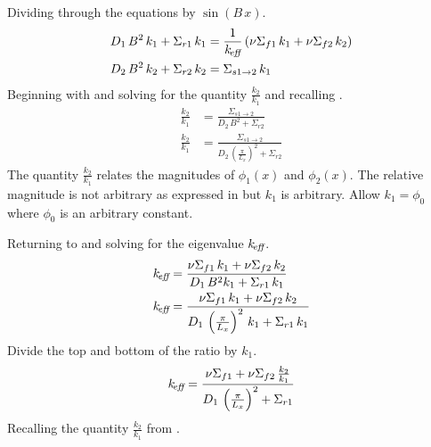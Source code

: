   Dividing through the equations by $\sin(B\,x)$.
  \begin{align}
    \label{eq:1d2g_expression1}
    D_1 \, B^2 \,k_1+ \Sigma_{r1}\,k_1 &= \frac{1}{k_{\!\mbox{\scriptsize \em eff}}} \left( \nu \Sigma_{f1}
      \, k_1 + \nu \Sigma_{f2} \, k_2 \right) \\
    \label{eq:1d2g_expression2}
    D_2 \, B^2 \, k_2 + \Sigma_{r2}\,k_2 &= \Sigma_{s 1\rightarrow 2} \, k_1
  \end{align}
  Beginning with  and solving for the quantity
  $\frac{k_2}{k_1}$ and recalling .
  \begin{align}
    \frac{k_2}{k_1} &= \frac{\Sigma_{s 1\rightarrow 2}}{D_2 \, B^2 + \Sigma_{r2}}
      \\
    \label{eq:1d2g_ratio}
    \frac{k_2}{k_1} &= \frac{\Sigma_{s 1\rightarrow 2}}{D_2 \,
      \left(\frac{\pi}{L_x}\right)^2 + \Sigma_{r2}}
  \end{align}
  The quantity $\frac{k_2}{k_1}$ relates the magnitudes of $\phi_1(x)$ and
  $\phi_2(x)$. The relative magnitude is not arbitrary as expressed in
   but $k_1$ is arbitrary. Allow $k_1 = \phi_0$ where
  $\phi_0$ is an arbitrary constant.

  Returning to  and solving for the eigenvalue
  $k_{\!\mbox{\scriptsize \em eff}}$.
  \begin{align}
    k_{\!\mbox{\scriptsize \em eff}} &= \frac{\nu \Sigma_{f1} \, k_1 + \nu \Sigma_{f2} \, k_2}
      {D_1 \, B^2 k_1 + \Sigma_{r1} \, k_1 }\\
    k_{\!\mbox{\scriptsize \em eff}} &= \frac{\nu \Sigma_{f1} \, k_1 + \nu \Sigma_{f2} \, k_2}
      {D_1 \, \left(\frac{\pi}{L_x}\right)^2 \, k_1 + \Sigma_{r1} \, k_1}
  \end{align}
  Divide the top and bottom of the ratio by $k_1$.
  \begin{equation}
    \label{eq:1d2g_keff}
    k_{\!\mbox{\scriptsize \em eff}} = \frac{\nu \Sigma_{f1} + \nu \Sigma_{f2} \, \frac{k_2}{k_1}}
      {D_1 \, \left(\frac{\pi}{L_x}\right)^2 + \Sigma_{r1}}
  \end{equation}
  Recalling the quantity $\frac{k_2}{k_1}$ from .

